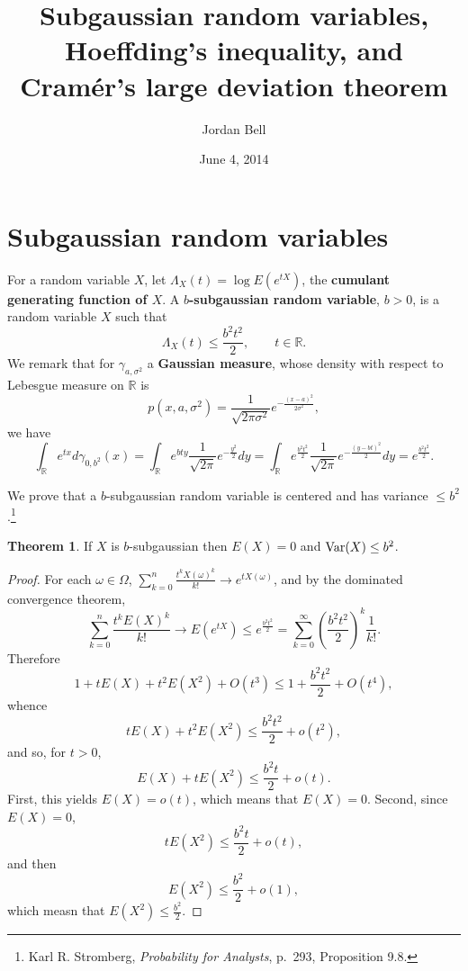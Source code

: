 \documentclass{article}
\newcommand{\Var}{\ensuremath\mathrm{Var}}
\theoremstyle{definition}
\newtheorem{theorem}{Theorem}
\theoremstyle{definition}
\begin{document}
\title{Subgaussian random variables, Hoeffding's inequality, and Cram\'er's large deviation theorem}
\author{Jordan Bell}
\date{June 4, 2014}

\maketitle


\section{Subgaussian random variables}
For a random variable $X$, let $\Lambda_X(t)=\log E(e^{tX})$, the 
\textbf{cumulant generating function of $X$}.
A \textbf{$b$-subgaussian random variable}, $b>0$, is a random variable $X$ such that
\[
\Lambda_X(t) \leq \frac{b^2 t^2}{2}, \qquad t \in \mathbb{R}.
\]
We remark that for $\gamma_{a,\sigma^2}$ a \textbf{Gaussian measure}, whose density with respect to Lebesgue
measure on $\mathbb{R}$ is
\[
p(x,a,\sigma^2)= \frac{1}{\sqrt{2\pi \sigma^2}} e^{-\frac{(x-a)^2}{2\sigma^2}},
\]
we have
\[
\int_\mathbb{R} e^{tx} d\gamma_{0,b^2}(x)
=\int_\mathbb{R} e^{bty} \frac{1}{\sqrt{2\pi}} e^{-\frac{y^2}{2}} dy
=\int_\mathbb{R} e^{\frac{b^2 t^2}{2}} \frac{1}{\sqrt{2\pi}} e^{-\frac{(y-bt)^2}{2}} dy
=e^{\frac{b^2t^2}{2}}.
\]

We prove that a $b$-subgaussian random variable is centered and has variance $\leq b^2$.\footnote{Karl  R. Stromberg,
{\em Probability for Analysts}, p.~293, Proposition 9.8.}


\begin{theorem}
If $X$ is $b$-subgaussian then $E(X)=0$ and $\Var(X) \leq b^2$. 
\end{theorem}
\begin{proof}
For each $\omega \in \Omega$,
$\sum_{k=0}^n \frac{t^k X(\omega)^k}{k!} \to e^{tX(\omega)}$, and by the dominated convergence theorem,
\[
\sum_{k=0}^n \frac{t^k E(X)^k}{k!} \to E(e^{tX}) \leq e^{\frac{b^2t^2}{2}}
=\sum_{k=0}^\infty \left(\frac{b^2 t^2}{2}\right)^k \frac{1}{k!}.
\]
Therefore
\[
1+tE(X)+t^2E(X^2) + O(t^3) \leq 1+\frac{b^2t^2}{2}+O(t^4),
\]
whence
\[
tE(X)+t^2E(X^2) \leq  \frac{b^2t^2}{2} + o(t^2),
\]
and so, for $t>0$,
\[
E(X)+tE(X^2) \leq \frac{b^2 t}{2} + o(t).
\]
First, this yields $E(X) = o(t)$, which means that $E(X)=0$. Second,
since $E(X)=0$, 
\[
tE(X^2) \leq \frac{b^2t}{2}+o(t),
\]
and then
\[
E(X^2) \leq \frac{b^2}{2}+o(1),
\]
which measn that $E(X^2) \leq \frac{b^2}{2}$.
\end{proof}
\end{document}
